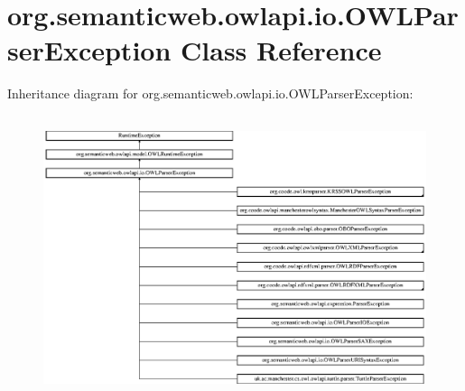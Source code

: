 \hypertarget{classorg_1_1semanticweb_1_1owlapi_1_1io_1_1_o_w_l_parser_exception}{\section{org.\-semanticweb.\-owlapi.\-io.\-O\-W\-L\-Parser\-Exception Class Reference}
\label{classorg_1_1semanticweb_1_1owlapi_1_1io_1_1_o_w_l_parser_exception}
}
Inheritance diagram for org.\-semanticweb.\-owlapi.\-io.\-O\-W\-L\-Parser\-Exception\-:\begin{figure}[H]
\begin{center}
\leavevmode
\includegraphics[height=8.305084cm]{classorg_1_1semanticweb_1_1owlapi_1_1io_1_1_o_w_l_parser_exception}
\end{center}
\end{figure}
